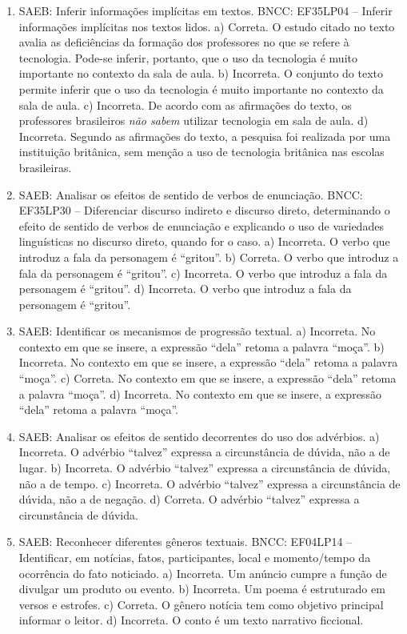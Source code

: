 \begin{enumerate}
\item
SAEB: Inferir informações implícitas em textos. BNCC: EF35LP04 -- Inferir informações implícitas nos textos lidos. a) Correta. O estudo citado no texto avalia as deficiências da formação dos professores no que se refere à tecnologia. Pode-se inferir, portanto, que o uso da tecnologia é muito importante no contexto da sala de aula. b) Incorreta. O conjunto do texto permite inferir que o uso da tecnologia é muito importante no contexto da sala de aula. c) Incorreta. De acordo com as afirmações do texto, os professores brasileiros \textit{não sabem} utilizar tecnologia em sala de aula. d) Incorreta. Segundo as afirmações do texto, a pesquisa foi realizada por uma instituição britânica, sem menção a uso de tecnologia britânica nas escolas brasileiras.

\item
SAEB: Analisar os efeitos de sentido de verbos de enunciação. BNCC: EF35LP30 -- Diferenciar discurso indireto e discurso direto, determinando o efeito de sentido de verbos de enunciação e explicando o uso de variedades linguísticas no discurso direto, quando for o caso. a) Incorreta. O verbo que introduz a fala da personagem é ``gritou''. b) Correta. O verbo que introduz a fala da personagem é ``gritou''. c) Incorreta. O verbo que introduz a fala da personagem é ``gritou''. d) Incorreta. O verbo que introduz a fala da personagem é ``gritou''.

\item
SAEB: Identificar os mecanismos de progressão textual. a) Incorreta. No contexto em que se insere, a expressão ``dela'' retoma a palavra ``moça''. b) Incorreta. No contexto em que se insere, a expressão ``dela'' retoma a palavra ``moça''. c) Correta. No contexto em que se insere, a expressão ``dela'' retoma a palavra ``moça''. d) Incorreta. No contexto em que se insere, a expressão ``dela'' retoma a palavra ``moça''.

\item
SAEB: Analisar os efeitos de sentido decorrentes do uso dos advérbios. a) Incorreta. O advérbio ``talvez'' expressa a circunstância de dúvida, não a de lugar. b) Incorreta. O advérbio ``talvez'' expressa a circunstância de dúvida, não a de tempo. c) Incorreta. O advérbio ``talvez'' expressa a circunstância de dúvida, não a de negação. d) Correta. O advérbio ``talvez'' expressa a circunstância de dúvida.

\item
SAEB: Reconhecer diferentes gêneros textuais. BNCC: EF04LP14 -- Identificar, em notícias, fatos, participantes, local e momento/tempo da ocorrência do fato noticiado. a) Incorreta. Um anúncio cumpre a função de divulgar um produto ou evento. b) Incorreta. Um poema é estruturado em versos e estrofes. c) Correta. O gênero notícia tem como objetivo principal informar o leitor. d) Incorreta. O conto é um texto narrativo ficcional.


\end{enumerate}

